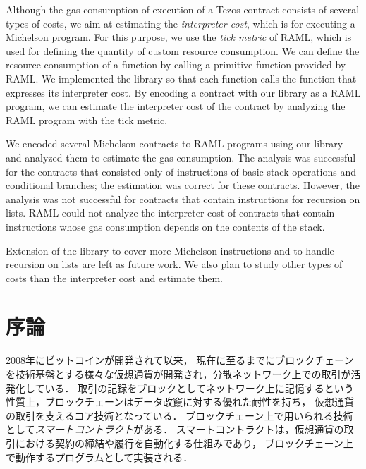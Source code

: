 \documentclass{kuisthesis}
\begin{document}
\begin{eabstract}
Although the gas consumption of execution of a Tezos contract consists of several types of costs, we aim at estimating the \emph{interpreter cost}, which is for executing a Michelson program.
For this purpose, we use the \emph{tick metric} of RAML, which is used for defining the quantity of custom resource consumption.
We can define the resource consumption of a function by calling a primitive function provided by RAML. 
We implemented the library so that each function calls the function that expresses its interpreter cost.
By encoding a contract with our library as a RAML program, we can estimate the interpreter cost of the contract by analyzing the RAML program with the tick metric.

We encoded several Michelson contracts to RAML programs using our library and analyzed them to estimate the gas consumption.
The analysis was successful for the contracts that consisted only of instructions of basic stack operations and conditional branches; the estimation was correct for these contracts.
However, the analysis was not successful for contracts that contain instructions for recursion on lists.
RAML could not analyze the interpreter cost of contracts that contain instructions whose gas consumption depends on the contents of the stack.

Extension of the library to cover more Michelson instructions and to handle recursion on lists are left as future work.
We also plan to study other types of costs than the interpreter cost and estimate them.


\end{eabstract}

\tableofcontents

\section{序論}\label{sec-intro}
2008年にビットコインが開発されて以来\cite{bitcoin}，
現在に至るまでにブロックチェーンを技術基盤とする様々な仮想通貨が開発され，分散ネットワーク上での取引が活発化している．
取引の記録をブロックとしてネットワーク上に記憶するという性質上，ブロックチェーンはデータ改竄に対する優れた耐性を持ち，
仮想通貨の取引を支えるコア技術となっている．
ブロックチェーン上で用いられる技術として\emph{スマートコントラクト}がある．
スマートコントラクトは，仮想通貨の取引における契約の締結や履行を自動化する仕組みであり，
ブロックチェーン上で動作するプログラムとして実装される．
\end{document}
